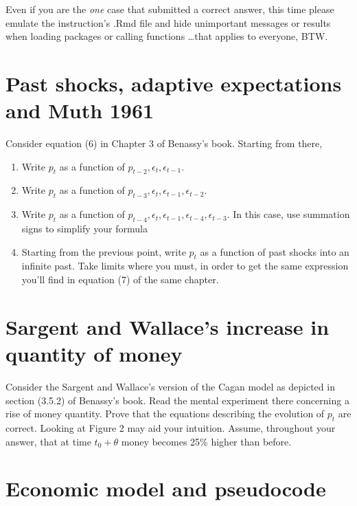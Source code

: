 \documentclass[11pt]{article}
\begin{document}
Even if you are the \emph{one} case that submitted a correct answer, this time please emulate the instruction's .Rmd file and hide unimportant messages or results when loading packages or calling functions \ldots that applies to everyone, BTW.

\section{Past shocks, adaptive expectations and Muth 1961}
Consider equation (6) in Chapter 3 of Benassy's book. Starting from there,

\begin{enumerate}
\item Write $p_t$ as a function of $p_{t-2}, \epsilon_{t}, \epsilon_{t-1}$.
\item Write $p_t$ as a function of $p_{t-3}, \epsilon_{t}, \epsilon_{t-1}, \epsilon_{t-2}$.
\item Write $p_t$ as a function of $p_{t-4}, \epsilon_{t}, \epsilon_{t-1}, \epsilon_{t-4}, \epsilon_{t-3}$. In this case, use summation signs to simplify your formula
\item Starting from the previous point, write $p_t$ as a function of past shocks into an infinite past. Take limits where you must, in order to get the same expression you'll find in equation (7) of the same chapter. 
\end{enumerate}

\section{Sargent and Wallace's increase in quantity of money}
Consider the Sargent and Wallace's version of the Cagan model as depicted in section (3.5.2) of Benassy's book. Read the mental experiment there concerning a rise of money quantity. Prove that the equations describing the evolution of $p_t$ are correct. Looking at Figure 2 may aid your intuition. Assume, throughout your answer, that at time $t_0+\theta$ money becomes 25\% higher than before.   


\section{Economic model and pseudocode}
\end{document}
